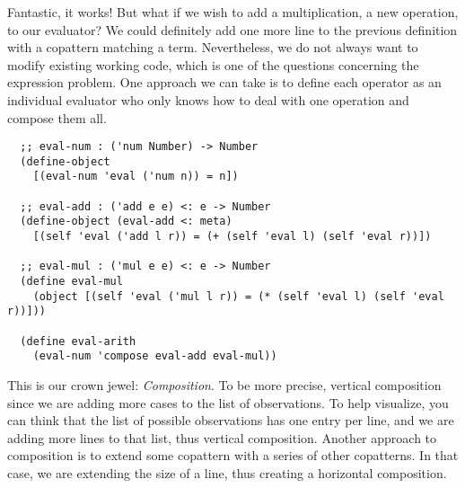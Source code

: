 Fantastic, it works! But what if we wish to add a multiplication, a new operation, to our evaluator? 
We could definitely add one more line to the previous definition with a copattern matching a  term.
Nevertheless, we do not always want to modify existing working code, which is one of the questions concerning the expression problem.
One approach we can take is to define each operator as an individual evaluator who only knows how to deal with one operation and compose them all.
\begin{verbatim}
  ;; eval-num : ('num Number) -> Number
  (define-object
    [(eval-num 'eval ('num n)) = n])
  
  ;; eval-add : ('add e e) <: e -> Number
  (define-object (eval-add <: meta)
    [(self 'eval ('add l r)) = (+ (self 'eval l) (self 'eval r))])
  
  ;; eval-mul : ('mul e e) <: e -> Number
  (define eval-mul
    (object [(self 'eval ('mul l r)) = (* (self 'eval l) (self 'eval r))]))
  
  (define eval-arith
    (eval-num 'compose eval-add eval-mul))

\end{verbatim}

This is our crown jewel: \emph{Composition}.
To be more precise, vertical composition since we are adding more cases to the list of observations.
To help visualize, you can think that the list of possible observations has one entry per line, and we are adding more lines to that list, thus vertical composition.
Another approach to composition is to extend some copattern with a series of other copatterns.
In that case, we are extending the size of a line, thus creating a horizontal composition.

